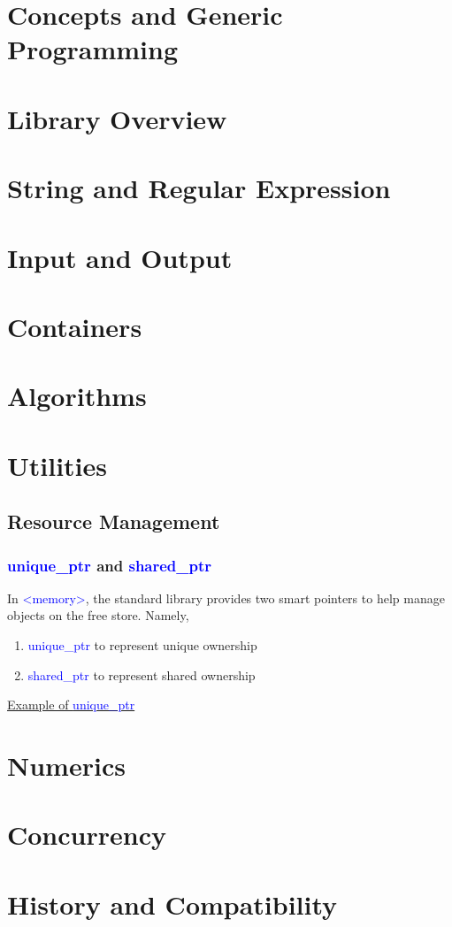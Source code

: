 \documentclass{article}
\newcommand{\be}[1]{\textcolor{blue}{#1}}
\begin{document}
\section{Concepts and Generic Programming}

\section{Library Overview}

\section{String and Regular Expression}

\section{Input and Output}

\section{Containers}

\section{Algorithms}

\section{Utilities}

\subsection{Resource Management}

\subsubsection{\be{unique\_ptr} and \be{shared\_ptr} }
In \be{<memory>}, the standard library provides two smart pointers to help manage objects on the free store. Namely, 
\begin{enumerate}
	\item \be{unique\_ptr} to represent unique ownership
	\item \be{shared\_ptr} to represent shared ownership
\end{enumerate}
\href{https://godbolt.org/z/nooEzP}{Example of \be{unique\_ptr}}
\section{Numerics}

\section{Concurrency}

\section{History and Compatibility}
\end{document}
